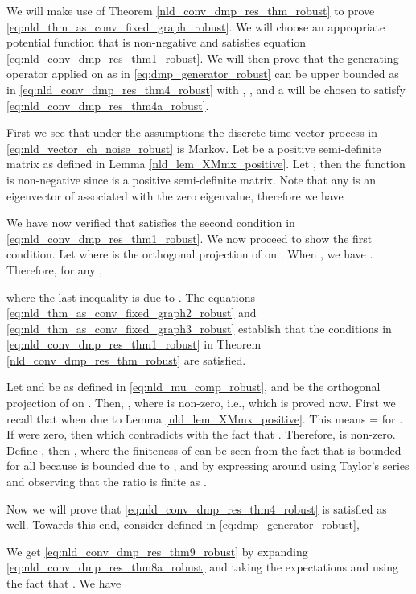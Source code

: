 \documentclass[onecolumn, draft, 12pt]{IEEEtran}
\begin{document}
\begin{IEEEproof}
We will make use of Theorem \ref{nld_conv_dmp_res_thm_robust} to prove \eqref{eq:nld_thm_as_conv_fixed_graph_robust}. We will choose an appropriate potential function  that is non-negative and satisfies equation \eqref{eq:nld_conv_dmp_res_thm1_robust}. We will then prove that the generating operator  applied on  as in \eqref{eq:dmp_generator_robust} can be upper bounded as in \eqref{eq:nld_conv_dmp_res_thm4_robust} with , , and a  will be chosen to satisfy \eqref{eq:nld_conv_dmp_res_thm4a_robust}. 

First we see that under the assumptions the discrete time vector process  in \eqref{eq:nld_vector_ch_noise_robust} is Markov. Let  be a positive semi-definite matrix as defined in Lemma \ref{nld_lem_XMmx_positive}. Let , then the function  is non-negative since  is a positive semi-definite matrix. Note that any  is an eigenvector of  associated with the zero eigenvalue, therefore we have
  
We have now verified that  satisfies the second condition in \eqref{eq:nld_conv_dmp_res_thm1_robust}. We now proceed to show the first condition. Let  where  is the orthogonal projection of  on . When , we have . Therefore, for any ,

where the last inequality is due to . The equations \eqref{eq:nld_thm_as_conv_fixed_graph2_robust} and \eqref{eq:nld_thm_as_conv_fixed_graph3_robust} establish that the conditions in \eqref{eq:nld_conv_dmp_res_thm1_robust} in Theorem \ref{nld_conv_dmp_res_thm_robust} are satisfied.

Let  and  be as defined in \eqref{eq:nld_mu_comp_robust}, and  be the orthogonal projection of  on . Then, , where  is non-zero, i.e.,  which is proved now. First we recall that  when  due to Lemma \ref{nld_lem_XMmx_positive}. This means  =  for . If  were zero, then  which contradicts with the fact that . Therefore,  is non-zero. Define , then , where the finiteness of  can be seen from the fact that  is bounded for all  because  is bounded due to , and by expressing  around  using Taylor's series and observing that the ratio  is finite as . 

Now we will prove that \eqref{eq:nld_conv_dmp_res_thm4_robust} is satisfied as well. Towards this end, consider  defined in \eqref{eq:dmp_generator_robust},

We get \eqref{eq:nld_conv_dmp_res_thm9_robust} by expanding \eqref{eq:nld_conv_dmp_res_thm8a_robust} and taking the expectations and using the fact that . We have 


\end{IEEEproof}
\end{document}
